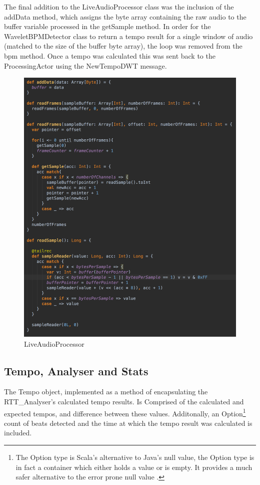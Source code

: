 \documentclass[a4paper, 11pt]{article}
\begin{document}
The final addition to the LiveAudioProcessor class was the inclusion of the addData method, which assigns the byte array containing the raw audio to the buffer variable processed in the getSample method. In order for the WaveletBPMDetector class to return a tempo result for a single window of audio (matched to the size of the buffer byte array), the loop was removed from the bpm method. Once a tempo was calculated this was sent back to the ProcessingActor using the NewTempoDWT message.

\begin{figure}[ht]
	\centering
	\includegraphics[scale=0.25]{images/liveAudioPro.jpg}
	\caption{LiveAudioProcessor}
	\label{fig: liveAudPro}
\end{figure}


\subsection{Tempo, Analyser and Stats}
The Tempo object, implemented as a method of encapsulating the RTT\_Analyser's calculated tempo results. Is Comprised of the calculated and expected tempos, and difference between these values. Additonally, an Option\footnote{The Option type is Scala's alternative to Java's null value, the Option type is in fact a container which either holds a value or is empty. It provides a much safer alternative to the error prone null value \cite{mariusEr}.} count of beats detected and the time at which the tempo result was calculated is included.\par 
\end{document}
